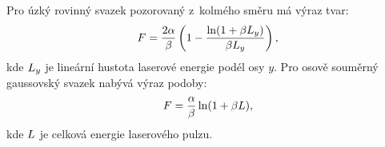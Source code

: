Pro úzký rovinný svazek pozorovaný z~kolmého směru má výraz tvar:
\begin{equation}
	\label{eq:lifth-sheet}
	F = \frac{2\alpha}{\beta}
	\left( 1 - \frac{\ln(1 + \beta L_y)}{\beta L_y} \right),
\end{equation}
kde $L_y$ je lineární hustota laserové energie podél osy $y$.
Pro osově souměrný gaussovský svazek nabývá výraz podoby:
\begin{equation}
	\label{eq:lifth-cylindric}
	F = \frac{\alpha}{\beta}
	\ln(1 + \beta L),
\end{equation}
kde $L$ je celková energie laserového pulzu.
